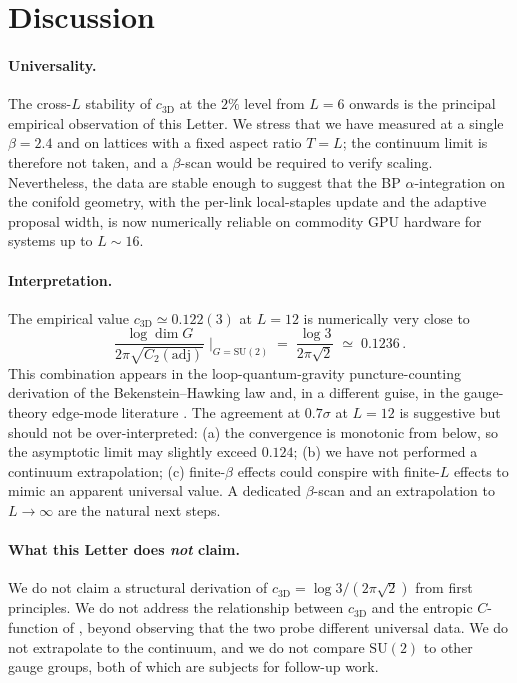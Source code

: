 \documentclass[aps,prl,reprint,superscriptaddress,floatfix,nofootinbib,amssymb]{revtex4-2}
\newcommand{\SUtwo}{\mathrm{SU}(2)}
\begin{document}
\section{Discussion}
\label{sec:discussion}

\paragraph{Universality.} The cross-$L$ stability of $c_{3\text{D}}$ at the $2\%$ level from $L\!=\!6$ onwards is the principal empirical observation of this Letter. We stress that we have measured at a single $\beta\!=\!2.4$ and on lattices with a fixed aspect ratio $T\!=\!L$; the continuum limit is therefore not taken, and a $\beta$-scan would be required to verify scaling. Nevertheless, the data are stable enough to suggest that the BP $\alpha$-integration on the conifold geometry, with the per-link local-staples update and the adaptive proposal width, is now numerically reliable on commodity GPU hardware for systems up to $L\sim\!16$.

\paragraph{Interpretation.}
The empirical value $c_{3\text{D}}\simeq 0.122(3)$ at $L\!=\!12$ is numerically very close to
\begin{equation}
\frac{\log\dim G}{2\pi\sqrt{C_2(\mathrm{adj})}} \;\bigg|_{G=\SUtwo} \;=\; \frac{\log 3}{2\pi\sqrt 2} \;\simeq\; 0.1236\,.
\label{eq:edgemode}
\end{equation}
This combination appears in the loop-quantum-gravity puncture-counting derivation of the Bekenstein--Hawking law \cite{ABCK1998} and, in a different guise, in the gauge-theory edge-mode literature \cite{Donnelly2012,DonnellyWall2014}. The agreement at $0.7\sigma$ at $L\!=\!12$ is suggestive but should not be over-interpreted: (a) the convergence is monotonic from below, so the asymptotic limit may slightly exceed $0.124$; (b) we have not performed a continuum extrapolation; (c) finite-$\beta$ effects could conspire with finite-$L$ effects to mimic an apparent universal value. A dedicated $\beta$-scan and an extrapolation to $L\!\to\!\infty$ are the natural next steps.

\paragraph{What this Letter does \emph{not} claim.}
We do not claim a structural derivation of $c_{3\text{D}}\!=\!\log 3/(2\pi\sqrt 2)$ from first principles. We do not address the relationship between $c_{3\text{D}}$ and the entropic $C$-function of \cite{Rabenstein2019}, beyond observing that the two probe different universal data. We do not extrapolate to the continuum, and we do not compare $\SUtwo$ to other gauge groups, both of which are subjects for follow-up work.
\end{document}
